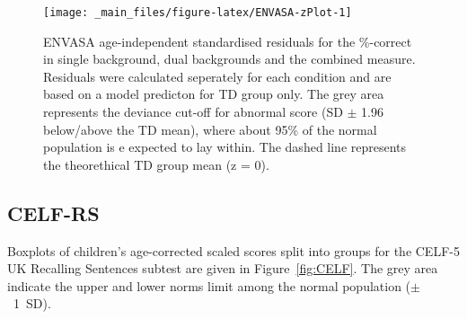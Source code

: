 \documentclass[a4paper, twoside]{templates/ociamthesis}
\begin{document}
\begin{figure}

{\centering \texttt{[image: \_main\_files/figure-latex/ENVASA-zPlot-1]} 

}

\caption{ENVASA age-independent standardised residuals for the \%-correct in single background, dual backgrounds and the combined measure. Residuals were calculated seperately for each condition and are based on a model predicton for TD group only. The grey area represents the deviance cut-off for abnormal score (SD $\pm$ 1.96 below/above the TD mean), where about 95\% of the normal population is e expected to lay within. The dashed line represents the theorethical TD group mean (z = 0).}\label{fig:ENVASA-zPlot}
\end{figure}

\begin{table}

\caption{\label{tab:ENVASA-zTab}Descriptive of the ENVASA standard residuals (z-scores) split by groups and test measures.}
\centering
{}
\end{table}

\hypertarget{celf-rs-1}{%
\subsection{CELF-RS}\label{celf-rs-1}}

Boxplots of children's age-corrected scaled scores split into groups for the CELF-5 UK Recalling Sentences subtest are given in Figure~\ref{fig:CELF}. The grey area indicate the upper and lower norms limit among the normal population (\(\pm\)~1~SD).
\end{document}
